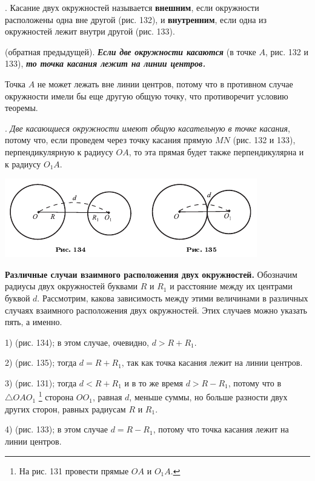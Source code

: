 \documentclass[oneside]{book}
\begin{document}
.
Касание двух окружностей называется \textbf{внешним}, если окружности расположены одна вне другой (рис. 132), и \textbf{внутренним}, если одна из окружностей лежит внутри другой (рис. 133).

 (обратная предыдущей).
\textbf{\emph{Если две окружности касаются}} (в точке $A$, рис. 132 и 133), \textbf{\emph{то точка касания лежит на линии центров.}}

Точка $A$ не может лежать вне линии центров, потому что в противном случае окружности имели бы еще другую общую точку, что противоречит условию теоремы.

.
\emph{Две касающиеся окружности имеют общую касательную в точке касания}, потому что, если проведем через точку касания прямую $MN$ (рис. 132 и 133), перпендикулярную к радиусу $OA$, то эта прямая будет также перпендикулярна и к радиусу $O_1A$.

\includegraphics{pics/ris-134-135}

\textbf{Различные случаи взаимного расположения двух окружностей.}
Обозначим радиусы двух окружностей буквами $R$ и $R_1$ и расстояние между их центрами буквой $d$.
Рассмотрим, какова зависимость между этими величинами в различных случаях взаимного расположения двух окружностей.
Этих случаев можно указать пять, а именно.

1)  (рис. 134);
в этом случае, очевидно, $d>R+R_1$.

2)  (рис. 135);
тогда $d=R+R_1$, так как точка касания лежит на линии центров.

3)  (рис. 131);
тогда $d<R+R_1$ и в то же время $d>R-R_1$, потому что в $\triangle OAO_1$%
\footnote{На рис. 131 провести прямые $OA$ и $O_1A$.}
сторона $OO_1$, равная $d$, меньше суммы, но больше разности двух других сторон, равных радиусам $R$ и $R_1$.

4)  (рис. 133);
в этом случае $d=R-R_1$, потому что точка касания лежит на линии центров.
\end{document}
